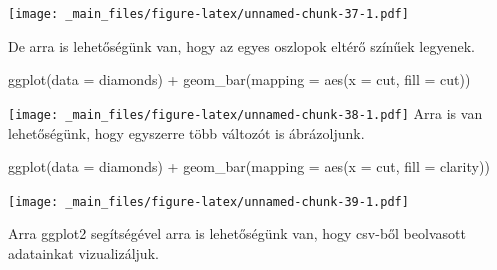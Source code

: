 \documentclass[
]{book}
\newenvironment{Shaded}{\begin{snugshade}}{\end{snugshade}}
\newcommand{\AttributeTok}[1]{\textcolor[rgb]{0.77,0.63,0.00}{#1}}
\newcommand{\FunctionTok}[1]{\textcolor[rgb]{0.00,0.00,0.00}{#1}}
\newcommand{\NormalTok}[1]{#1}
\newcommand{\SpecialCharTok}[1]{\textcolor[rgb]{0.00,0.00,0.00}{#1}}
\begin{document}
\texttt{[image: \_main\_files/figure-latex/unnamed-chunk-37-1.pdf]}

De arra is lehetőségünk van, hogy az egyes oszlopok eltérő színűek
legyenek.

\begin{Shaded}
\begin{Highlighting}[]
\FunctionTok{ggplot}\NormalTok{(}\AttributeTok{data =}\NormalTok{ diamonds) }\SpecialCharTok{+}
  \FunctionTok{geom\_bar}\NormalTok{(}\AttributeTok{mapping =} \FunctionTok{aes}\NormalTok{(}\AttributeTok{x =}\NormalTok{ cut, }\AttributeTok{fill =}\NormalTok{ cut))}
\end{Highlighting}
\end{Shaded}

\texttt{[image: \_main\_files/figure-latex/unnamed-chunk-38-1.pdf]} Arra
is van lehetőségünk, hogy egyszerre több változót is ábrázoljunk.

\begin{Shaded}
\begin{Highlighting}[]
\FunctionTok{ggplot}\NormalTok{(}\AttributeTok{data =}\NormalTok{ diamonds) }\SpecialCharTok{+}
  \FunctionTok{geom\_bar}\NormalTok{(}\AttributeTok{mapping =} \FunctionTok{aes}\NormalTok{(}\AttributeTok{x =}\NormalTok{ cut, }\AttributeTok{fill =}\NormalTok{ clarity))}
\end{Highlighting}
\end{Shaded}

\texttt{[image: \_main\_files/figure-latex/unnamed-chunk-39-1.pdf]}

Arra ggplot2 segítségével arra is lehetőségünk van, hogy csv-ből
beolvasott adatainkat vizualizáljuk.
\end{document}

